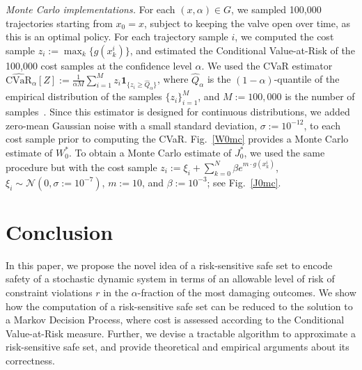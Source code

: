 \documentclass[letterpaper, 10 pt, conference]{ieeeconf}  %
\begin{document}
\textit{Monte Carlo implementations.}
For each $(x,\alpha) \in G$, we sampled 100,000 trajectories starting from $x_0 = x$, subject to keeping the valve open over time,
as this is an optimal policy.
For each trajectory sample $i$, we computed the cost sample $z_i := \max_k\{g(x_k^i)\}$, and estimated the Conditional Value-at-Risk
of the 100,000 cost samples at the confidence level $\alpha$. 
We used the CVaR estimator $\widehat{\text{CVaR}}_\alpha[Z] := \frac{1}{\alpha M}\sum_{i=1}^M z_i \textbf{1}_{\{z_i\geq \hat{Q}_\alpha\}}$,
where $\hat{Q}_\alpha$ is the $(1-\alpha)$-quantile of the empirical distribution of the samples $\{z_i\}_{i=1}^M$,
and $M := 100,000$ is the number of samples~\cite[Sec. 6.5.1]{shapiro2009lectures}.
Since this estimator is designed for continuous distributions, %
we added zero-mean Gaussian noise with a small standard deviation, $\sigma := 10^{-12}$, to each cost sample prior to computing the CVaR.
Fig.~\ref{W0mc} provides a Monte Carlo estimate of $W_0^*$.
To obtain a Monte Carlo estimate of $J_0^*$, we used the same procedure but with the cost sample 
$z_i := \xi_i + \sum_{k=0}^N \beta e^{m\cdot g(x_k^i)}$, $\xi_i \sim \mathcal{N}(0, \sigma := 10^{-7})$,
$m := 10$, and $\beta := 10^{-3}$; see Fig.~\ref{J0mc}.
%
%
\section{Conclusion}\label{conc}
In this paper, we propose the novel idea of a risk-sensitive safe set
to encode safety of a stochastic dynamic system in terms of an allowable level of risk of constraint violations $r$ 
in the $\alpha$-fraction of the most damaging outcomes.
We show how the computation of a risk-sensitive safe set can be
reduced to the solution to a Markov Decision Process, where cost is assessed according to the Conditional Value-at-Risk measure. 
Further, we devise a tractable algorithm to approximate a risk-sensitive safe set, and provide theoretical and empirical arguments about its correctness.
\end{document}
